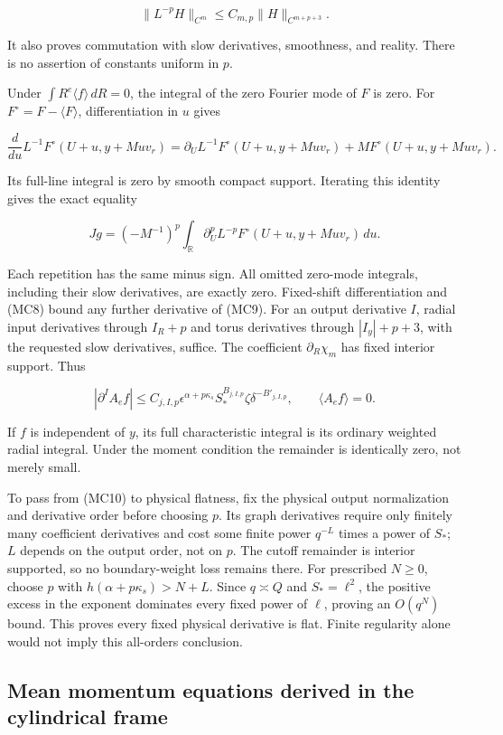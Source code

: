 \documentclass[10pt,a4paper]{article}
\begin{document}
\[
\|L^{-p}H\|_{C^m}\le C_{m,p}\|H\|_{C^{m+p+3}}.
\tag{MC8}
\]

It also proves commutation with slow derivatives, smoothness, and reality. There is no assertion of constants uniform in \(p\).

Under \(\int R^e\langle f\rangle\,dR=0\), the integral of the zero Fourier mode of \(F\) is zero. For \(F^\circ=F-\langle F\rangle\), differentiation in \(u\) gives

\[
\frac d{du}L^{-1}F^\circ(U+u,y+Muv_r)
=\partial_UL^{-1}F^\circ(U+u,y+Muv_r)+MF^\circ(U+u,y+Muv_r).
\]

Its full-line integral is zero by smooth compact support. Iterating this identity gives the exact equality

\[
Jg=(-M^{-1})^p\int_{\mathbb R}
\partial_U^pL^{-p}F^\circ(U+u,y+Muv_r)\,du.
\tag{MC9}
\]

Each repetition has the same minus sign. All omitted zero-mode integrals, including their slow derivatives, are exactly zero. Fixed-shift differentiation and (MC8) bound any further derivative of (MC9). For an output derivative \(I\), radial input derivatives through \(I_R+p\) and torus derivatives through \(|I_y|+p+3\), with the requested slow derivatives, suffice. The coefficient \(\partial_R\chi_m\) has fixed interior support. Thus

\[
|\partial^IA_ef|\le C_{j,I,p}
\epsilon^{\alpha+p\kappa_s}S_*^{B_{j,I,p}}
\zeta\delta^{-B'_{j,I,p}},\qquad
\langle A_ef\rangle=0.
\tag{MC10}
\]

If \(f\) is independent of \(y\), its full characteristic integral is its ordinary weighted radial integral. Under the moment condition the remainder is identically zero, not merely small.

To pass from (MC10) to physical flatness, fix the physical output normalization and derivative order before choosing \(p\). Its graph derivatives require only finitely many coefficient derivatives and cost some finite power \(q^{-L}\) times a power of \(S_*\); \(L\) depends on the output order, not on \(p\). The cutoff remainder is interior supported, so no boundary-weight loss remains there. For prescribed \(N\ge0\), choose \(p\) with \(h(\alpha+p\kappa_s)>N+L\). Since \(q\asymp Q\) and \(S_*=\ell^2\), the positive excess in the exponent dominates every fixed power of \(\ell\), proving an \(O(q^N)\) bound. This proves every fixed physical derivative is flat. Finite regularity alone would not imply this all-orders conclusion.

\subsection{Mean momentum equations derived in the cylindrical frame}
\end{document}
